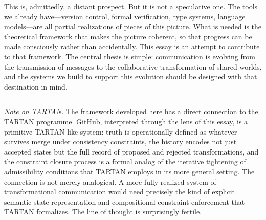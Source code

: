 \documentclass[12pt, letterpaper]{article}
\begin{document}
This is, admittedly, a distant prospect. But it is not a speculative one. The tools we already have---version control, formal verification, type systems, language models---are all partial realizations of pieces of this picture. What is needed is the theoretical framework that makes the picture coherent, so that progress can be made consciously rather than accidentally. This essay is an attempt to contribute to that framework. The central thesis is simple: communication is evolving from the transmission of messages to the collaborative transformation of shared worlds, and the systems we build to support this evolution should be designed with that destination in mind.

\vspace{2em}

\begin{center}
  \textcolor{rulecolor}{\rule{0.5\textwidth}{0.4pt}}
\end{center}

\vspace{1em}

\noindent\textit{Note on TARTAN.} The framework developed here has a direct connection to the TARTAN programme. GitHub, interpreted through the lens of this essay, is a primitive TARTAN-like system: truth is operationally defined as whatever survives merge under consistency constraints, the history encodes not just accepted states but the full record of proposed and rejected transformations, and the constraint closure process is a formal analog of the iterative tightening of admissibility conditions that TARTAN employs in its more general setting. The connection is not merely analogical. A more fully realized system of transformational communication would need precisely the kind of explicit semantic state representation and compositional constraint enforcement that TARTAN formalizes. The line of thought is surprisingly fertile.

\bigskip
\end{document}
